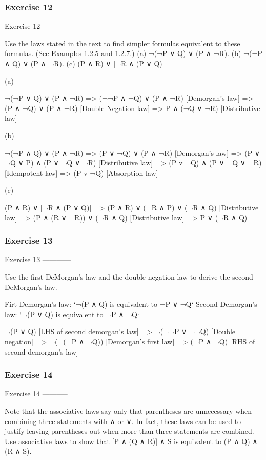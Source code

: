 \subsubsection{Exercise 12}
Exercise 12
------------

    Use the laws stated in the text to find simpler formulas equivalent to these
    formulas. (See Examples 1.2.5 and 1.2.7.)
    (a) ¬(¬P ∨ Q) ∨ (P ∧ ¬R).
    (b) ¬(¬P ∧ Q) ∨ (P ∧ ¬R).
    (c) (P ∧ R) ∨ [¬R ∧ (P ∨ Q)]

(a)

    ¬(¬P ∨ Q) ∨ (P ∧ ¬R)
    => (¬¬P ∧ ¬Q) ∨ (P ∧ ¬R) [Demorgan's law]
    => (P ∧ ¬Q) ∨ (P ∧ ¬R) [Double Negation law]
    => P ∧ (¬Q ∨ ¬R) [Distributive law]

(b)

    ¬(¬P ∧ Q) ∨ (P ∧ ¬R)
    => (P ∨ ¬Q) ∨ (P ∧ ¬R) [Demorgan's law]
    => (P ∨ ¬Q ∨ P) ∧ (P ∨ ¬Q ∨ ¬R) [Distributive law]
    => (P v ¬Q) ∧ (P ∨ ¬Q ∨ ¬R) [Idempotent law]
    => (P v ¬Q) [Absorption law]

(c)

    (P ∧ R) ∨ [¬R ∧ (P ∨ Q)]
    => (P ∧ R) ∨ (¬R ∧ P) ∨ (¬R ∧ Q) [Distributive law]
    => (P ∧ (R ∨ ¬R)) ∨ (¬R ∧ Q) [Distributive law]
    => P ∨ (¬R ∧ Q)

\subsubsection{Exercise 13}
Exercise 13
------------

    Use the first DeMorgan’s law and the double negation law to derive the
    second DeMorgan’s law.

Firt Demorgan's law: `¬(P ∧ Q) is equivalent to ¬P ∨ ¬Q`
Second Demorgan's law: `¬(P ∨ Q) is equivalent to ¬P ∧ ¬Q`

    ¬(P ∨ Q) [LHS of second demorgan's law]
    => ¬(¬¬P ∨ ¬¬Q) [Double negation]
    => ¬(¬(¬P ∧ ¬Q)) [Demorgan's first law]
    => (¬P ∧ ¬Q) [RHS of second demorgan's law]

\subsubsection{Exercise 14}
Exercise 14
-----------

    Note that the associative laws say only that parentheses are unnecessary
    when combining three statements with ∧ or ∨. In fact, these laws can be
    used to justify leaving parentheses out when more than three statements
    are combined. Use associative laws to show that [P ∧ (Q ∧ R)] ∧ S is
    equivalent to (P ∧ Q) ∧ (R ∧ S).

